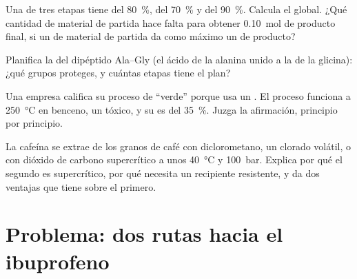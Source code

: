 \begin{exercise}[$\star\star\star$]\label{exo:g12:synthesis-strategy:12}
Una  de tres etapas tiene  del \qty{80}{\percent},
del \qty{70}{\percent} y del \qty{90}{\percent}. Calcula el 
global. ¿Qué cantidad de material de partida hace falta para obtener
\qty{0.10}{mol} de producto final, si un  de material de partida da
como máximo un  de producto?
\end{exercise}

\begin{exercise}[$\star\star\star$]\label{exo:g12:synthesis-strategy:13}
Planifica la  del dipéptido Ala--Gly (el ácido de la alanina
unido a la  de la glicina): ¿qué grupos proteges, y cuántas etapas
tiene el plan?
\end{exercise}

\begin{exercise}[$\star\star\star$]\label{exo:g12:synthesis-strategy:14}
Una empresa califica su proceso de ``verde'' porque usa un .
El proceso funciona a \qty{250}{\celsius} en benceno, un 
tóxico, y su  es del \qty{35}{\percent}. Juzga la
afirmación, principio por principio.
\end{exercise}

\begin{exercise}[$\star\star\star$]\label{exo:g12:synthesis-strategy:15}
La cafeína se extrae de los granos de café con diclorometano, un
 clorado volátil, o con dióxido de carbono supercrítico a unos
\qty{40}{\celsius} y \qty{100}{bar}. Explica por qué el segundo es
supercrítico, por qué necesita un recipiente resistente, y da dos
ventajas que tiene sobre el primero.
\end{exercise}

\section{Problema: dos rutas hacia el ibuprofeno}

